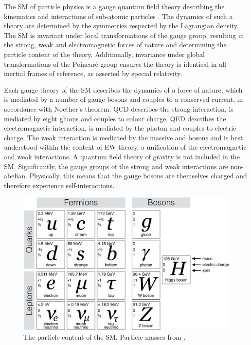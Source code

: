 
The \ac{SM} of particle physics is a gauge quantum field theory describing the kinematics and interactions of sub-atomic particles \cite{Aitchison,Peskin}. The dynamics of such a 
theory are determined by the symmetries respected by the Lagrangian density.
The \ac{SM} is invariant under local transformations of the \SMgroup gauge group,
resulting in the strong, weak and electromagnetic forces of nature and determining
the particle content of the theory. Additionally, invariance under global 
transformations of the Poincaré group ensures the theory is identical in all 
inertial frames of reference, as asserted by special relativity.

Each gauge theory of the \ac{SM} describes the dynamics of a force of nature, which 
is mediated by a number of gauge bosons and couples to a conserved current, in 
accordance with Noether's theorem. \ac{QCD} describes the strong 
interaction, is mediated by eight gluons and couples to colour charge. \ac{QED}
describes the electromagnetic interaction, is mediated by the 
photon and couples to electric charge. The weak interaction is mediated by the massive 
\PWpm and \PZ bosons and is best understood within the context of \ac{EW} theory,
a unification of the electromagnetic and weak interactions. A quantum field theory of
gravity is not included in the \ac{SM}. Significantly, the gauge groups of 
the strong and weak interactions are non-abelian. Physically, this means that the
gauge bosons are themselves charged and therefore experience self-interactions.

\begin{figure}
	\includegraphics[width=\largefigwidth]{tex/motivation/sm_particles}
	\caption{The particle content of the \ac{SM}. Particle masses from \cite{PDG}.
	}
	\label{fig:sm_particles}
\end{figure}


